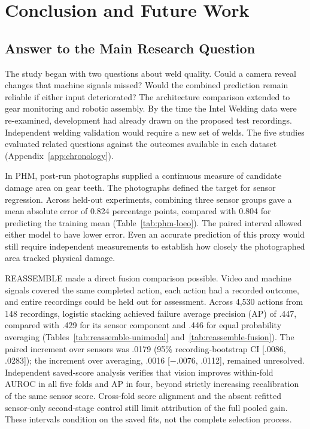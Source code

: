 \chapter{Conclusion and Future Work}
\label{ch:conclusion}

\section{Answer to the Main Research Question}
The study began with two questions about weld quality. Could a camera reveal changes that machine signals missed? Would the combined prediction remain reliable if either input deteriorated? The architecture comparison extended to gear monitoring and robotic assembly. By the time the Intel Welding data were re-examined, development had already drawn on the proposed test recordings. Independent welding validation would require a new set of welds. The five studies evaluated related questions against the outcomes available in each dataset (Appendix~\ref{app:chronology}).

In PHM, post-run photographs supplied a continuous measure of candidate damage area on gear teeth. The photographs defined the target for sensor regression. Across held-out experiments, combining three sensor groups gave a mean absolute error of 0.824 percentage points, compared with 0.804 for predicting the training mean (Table~\ref{tab:phm-loeo}). The paired interval allowed either model to have lower error. Even an accurate prediction of this proxy would still require independent measurements to establish how closely the photographed area tracked physical damage.

REASSEMBLE made a direct fusion comparison possible. Video and machine signals covered the same completed action, each action had a recorded outcome, and entire recordings could be held out for assessment. Across 4,530 actions from 148 recordings, logistic stacking achieved failure average precision (AP) of .447, compared with .429 for its sensor component and .446 for equal probability averaging (Tables~\ref{tab:reassemble-unimodal} and~\ref{tab:reassemble-fusion}). The paired increment over sensors was .0179 (95\% recording-bootstrap CI [.0086, .0283]); the increment over averaging, .0016 [$-.0076$, .0112], remained unresolved. Independent saved-score analysis verifies that vision improves within-fold AUROC in all five folds and AP in four, beyond strictly increasing recalibration of the same sensor score. Cross-fold score alignment and the absent refitted sensor-only second-stage control still limit attribution of the full pooled gain. These intervals condition on the saved fits, not the complete selection process.

